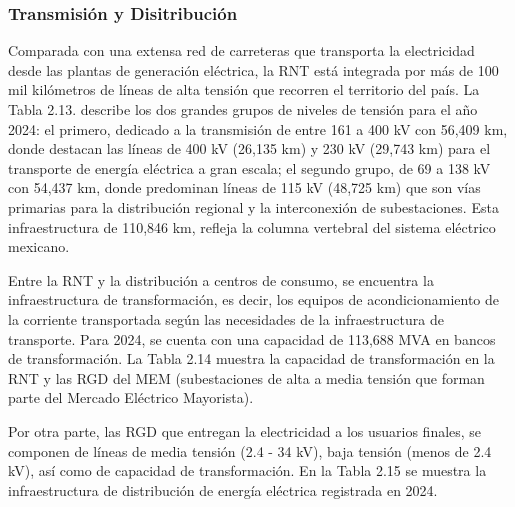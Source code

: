 \documentclass{sener2025}
\begin{document}
\subsubsection{Transmisión y Disitribución}

Comparada con una extensa red de carreteras que transporta la electricidad desde las plantas de generación eléctrica, la RNT está integrada por más de 100 mil kilómetros de líneas de alta tensión que recorren el territorio del país. La Tabla 2.13. describe los dos grandes grupos de niveles de tensión para el año 2024: el primero, dedicado a la transmisión de entre 161 a 400 kV con 56,409 km, donde destacan las líneas de 400 kV (26,135 km) y 230 kV (29,743 km) para el transporte de energía eléctrica a gran escala; el segundo grupo, de 69 a 138 kV con 54,437 km, donde predominan líneas de 115 kV (48,725 km) que son vías primarias para la distribución regional y la interconexión de subestaciones. Esta infraestructura de 110,846 km, refleja la columna vertebral del sistema eléctrico mexicano.


Entre la RNT y la distribución a centros de consumo, se encuentra la infraestructura de transformación, es decir, los equipos de acondicionamiento de la corriente transportada según las necesidades de la infraestructura de transporte. Para 2024, se cuenta con una capacidad de 113,688 MVA en bancos de transformación. La Tabla 2.14 muestra la capacidad de transformación en la RNT y las RGD del MEM (subestaciones de alta a media tensión que forman parte del Mercado Eléctrico Mayorista).


Por otra parte, las RGD que entregan la electricidad a los usuarios finales, se componen de líneas de media tensión (2.4 - 34 kV), baja tensión (menos de 2.4 kV), así como de capacidad de transformación. En la Tabla 2.15 se muestra la infraestructura de distribución de energía eléctrica registrada en 2024.
\end{document}
